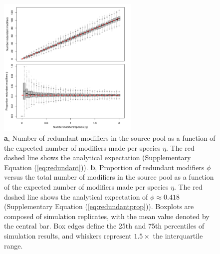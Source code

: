 \documentclass[onecolumn,preprintnumbers,amsmath,amssymb,superscriptaddress]{revtex4-1}
\begin{document}
\begin{bibunit}
\begin{figure}[h!]
\centering
\includegraphics[width=0.6\textwidth]{fig_redundancy.pdf}
\caption{
\textbf{a}, Number of redundant modifiers in the source pool as a function of the expected number of modifiers made per species $\eta$.
The red dashed line shows the analytical expectation (Supplementary Equation (\ref{eq:redundant})).
\textbf{b}, Proportion of redundant modifiers $\phi$ versus the total number of modifiers in the source pool as a function of the expected number of modifiers made per species $\eta$.
The red dashed line shows the analytical expectation of $\phi \approx 0.418$ (Supplementary Equation (\ref{eq:redundantprop})).
Boxplots are composed of simulation replicates, with the mean value denoted by the central bar.
Box edges define the 25th and 75th percentiles of simulation results, and whiskers represent $1.5\times$ the interquartile range.}
\label{fig:redundancy}
\end{figure}


\end{bibunit}
\end{document}
